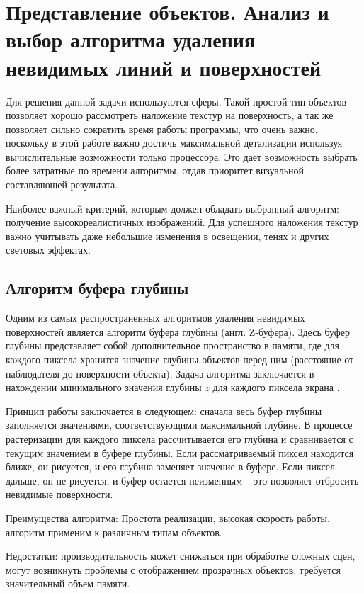\section{Представление объектов. Анализ и выбор алгоритма удаления невидимых линий и поверхностей}

Для решения данной задачи используются сферы. Такой простой тип объектов позволяет хорошо рассмотреть наложение текстур на поверхность, а так же позволяет сильно сократить время работы программы, что очень важно, поскольку в этой работе важно достичь максимальной детализации используя вычислительные возможности только процессора. Это дает возможность выбрать более затратные по времени алгоритмы, отдав приоритет визуальной составляющей результата.

Наиболее важный критерий, которым должен обладать выбранный алгоритм: получение высокореалистичных изображений. Для успешного наложения текстур важно учитывать даже небольшие изменения в освещении, тенях и других световых эффектах.

\subsection{Алгоритм буфера глубины}

Одним из самых распространенных алгоритмов удаления невидимых поверхностей является алгоритм буфера глубины (англ. Z-буфера). Здесь буфер глубины представляет собой дополнительное пространство в памяти, где для каждого пиксела хранится значение глубины объектов перед ним (расстояние от наблюдателя до поверхности объекта). Задача алгоритма заключается в нахождении минимального значения глубины $z$ для каждого пиксела экрана \cite{b2} \cite{b3}.

Принцип работы заключается в следующем: сначала весь буфер глубины заполняется значениями, соответствующими максимальной глубине. В процессе растеризации для каждого пиксела рассчитывается его глубина и сравнивается с текущим значением в буфере глубины. Если рассматриваемый пиксел находится ближе, он рисуется, и его глубина заменяет значение в буфере. Если пиксел дальше, он не рисуется, и буфер остается неизменным – это позволяет отбросить невидимые поверхности.

Преимущества алгоритма: Простота реализации, высокая скорость работы, алгоритм применим к различным типам объектов.

Недостатки: производительность может снижаться при обработке сложных сцен, могут возникнуть проблемы с отображением прозрачных объектов, требуется значительный объем памяти.

